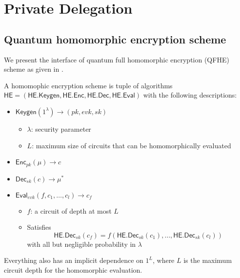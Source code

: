 \section{Private Delegation}


\subsection{Quantum homomorphic encryption scheme}


We present the interface of quantum full homomorphic encryption (QFHE) scheme as given in \cite{mahadev_qfhe}.

\begin{dfn}
	A homomophic encryption scheme is tuple of algorithms $\mathsf{HE}=(\mathsf{HE.Keygen}, \mathsf{HE.Enc}, \mathsf{HE.Dec}, \mathsf{HE.Eval})$ with the following descriptions:
	\begin{itemize}
		\item $\mathsf{Keygen}(1^\lambda)\rightarrow(pk, evk, sk)$
			\begin{itemize}
				\item $\lambda$: security parameter
				\item $L$: maximum size of circuits that can be homomorphically evaluated
			\end{itemize}
		\item $\mathsf{Enc}_{pk}(\mu)\rightarrow c$
		\item $\mathsf{Dec}_{sk}(c)\rightarrow \mu^*$
		\item $\mathsf{Eval}_{evk}(f, c_1, \ldots, c_l)\rightarrow c_f$
			\begin{itemize}
				\item $f$: a circuit of depth at most $L$
				\item Satisfies $$\mathsf{HE.Dec}_{sk}(c_f)=f(\mathsf{HE.Dec}_{sk}(c_1),\ldots,\mathsf{HE.Dec}_{sk}(c_l))$$ with all but negligible probability in $\lambda$
			\end{itemize}
	\end{itemize}
\end{dfn}

Everything also has an implicit dependence on $1^L$, where $L$ is the maximum circuit depth for the homomorphic evaluation.

